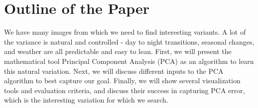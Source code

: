 \section{Outline of the Paper}

We have many images from which we need to find interesting variants.  A lot of the variance is natural and controlled - day to night transitions, seasonal changes, and weather are all predictable and easy to lean.  First, we will present the mathematical tool Principal Component Analysis (PCA) as an algorithm to learn this natural variation.  Next, we will discuss different inputs to the PCA algorithm to best capture our goal.  Finally, we will show several visualization tools and evaluation criteria, and discuss their success in capturing PCA error, which is the interesting variation for which we search.


